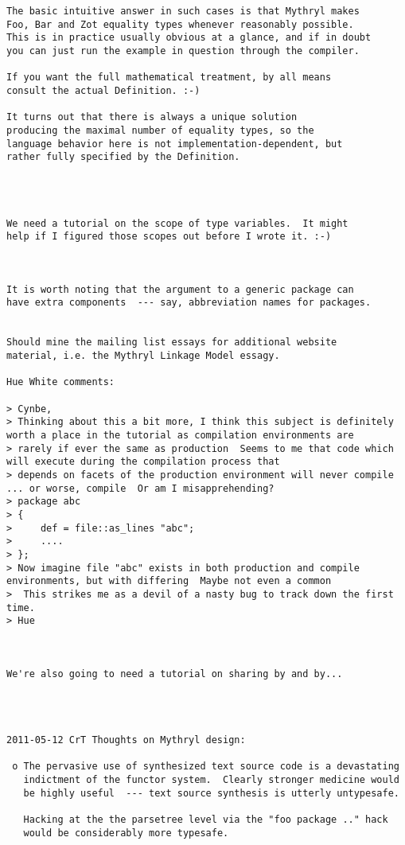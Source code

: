 \begin{verbatim}
The basic intuitive answer in such cases is that Mythryl makes 
Foo, Bar and Zot equality types whenever reasonably possible. 
This is in practice usually obvious at a glance, and if in doubt 
you can just run the example in question through the compiler. 

If you want the full mathematical treatment, by all means 
consult the actual Definition. :-) 

It turns out that there is always a unique solution 
producing the maximal number of equality types, so the 
language behavior here is not implementation-dependent, but 
rather fully specified by the Definition. 




We need a tutorial on the scope of type variables.  It might 
help if I figured those scopes out before I wrote it. :-) 



It is worth noting that the argument to a generic package can 
have extra components  --- say, abbreviation names for packages. 


Should mine the mailing list essays for additional website 
material, i.e. the Mythryl Linkage Model essagy. 

Hue White comments: 

> Cynbe, 
> Thinking about this a bit more, I think this subject is definitely worth a place in the tutorial as compilation environments are 
> rarely if ever the same as production  Seems to me that code which will execute during the compilation process that 
> depends on facets of the production environment will never compile ... or worse, compile  Or am I misapprehending? 
> package abc 
> { 
>     def = file::as_lines "abc"; 
>     .... 
> }; 
> Now imagine file "abc" exists in both production and compile environments, but with differing  Maybe not even a common 
>  This strikes me as a devil of a nasty bug to track down the first time. 
> Hue 



We're also going to need a tutorial on sharing by and by... 




2011-05-12 CrT Thoughts on Mythryl design: 

 o The pervasive use of synthesized text source code is a devastating 
   indictment of the functor system.  Clearly stronger medicine would 
   be highly useful  --- text source synthesis is utterly untypesafe. 

   Hacking at the the parsetree level via the "foo package .." hack 
   would be considerably more typesafe. 


\end{verbatim}
